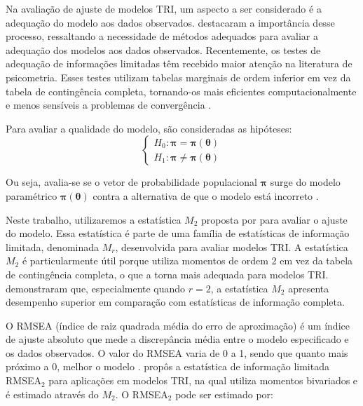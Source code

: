 Na avaliação de ajuste de modelos TRI, um aspecto a ser considerado é a adequação do modelo aos dados observados.  destacaram a importância desse processo, ressaltando a necessidade de métodos adequados para avaliar a adequação dos modelos aos dados observados. Recentemente, os testes de adequação de informações limitadas têm recebido maior atenção na literatura de psicometria. Esses testes utilizam tabelas marginais de ordem inferior em vez da tabela de contingência completa, tornando-os mais eficientes computacionalmente e menos sensíveis a problemas de convergência \cite{maydeu2014assessing}.

Para avaliar a qualidade do modelo, são consideradas as hipóteses:
\[
\begin{cases}
H_0: \boldsymbol{\pi} = \boldsymbol{\pi}(\boldsymbol{\theta}) \\

H_1: \boldsymbol{\pi} \neq \boldsymbol{\pi}(\boldsymbol{\theta})
\end{cases}
\]

Ou seja, avalia-se se o vetor de probabilidade populacional $\boldsymbol{\pi}$ surge do modelo paramétrico $\boldsymbol{\pi}(\boldsymbol{\theta})$ contra a alternativa de que o modelo está incorreto \cite{maydeu2006limited}.

Neste trabalho, utilizaremos a estatística $M_2$ proposta por  para avaliar o ajuste do modelo. Essa estatística é parte de uma família de estatísticas de informação limitada, denominada $M_r$, desenvolvida para avaliar modelos TRI. A estatística $M_2$ é particularmente útil porque utiliza momentos de ordem 2 em vez da tabela de contingência completa, o que a torna mais adequada para modelos TRI.  demonstraram que, especialmente quando $r=2$, a estatística $M_2$ apresenta desempenho superior em comparação com estatísticas de informação completa. 



O RMSEA (índice de raiz quadrada média do erro de aproximação) é um índice de ajuste absoluto que mede a discrepância média entre o modelo especificado e os dados observados. O valor do RMSEA varia de 0 a 1, sendo que quanto mais próximo a 0, melhor o modelo \cite{kline2016principles}.  propôs a estatística de informação limitada RMSEA$_{2}$ para aplicações em modelos TRI, na qual utiliza momentos bivariados e é estimado através do $M_2$. O RMSEA$_2$ pode ser estimado por:

